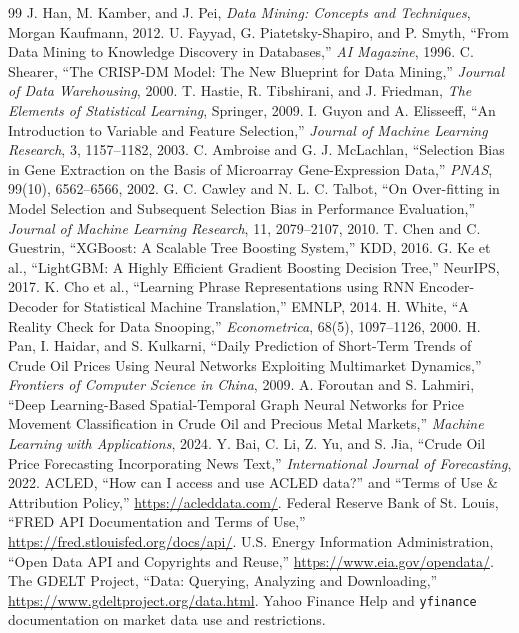 \documentclass[10pt,a4paper]{article}
\newcommand{\code}[1]{\texttt{#1}}
\begin{document}
\begin{thebibliography}{99}
     J. Han, M. Kamber, and J. Pei, \textit{Data Mining: Concepts and Techniques}, Morgan Kaufmann, 2012.
     U. Fayyad, G. Piatetsky-Shapiro, and P. Smyth, ``From Data Mining to Knowledge Discovery in Databases,'' \textit{AI Magazine}, 1996.
     C. Shearer, ``The CRISP-DM Model: The New Blueprint for Data Mining,'' \textit{Journal of Data Warehousing}, 2000.
     T. Hastie, R. Tibshirani, and J. Friedman, \textit{The Elements of Statistical Learning}, Springer, 2009.
     I. Guyon and A. Elisseeff, ``An Introduction to Variable and Feature Selection,'' \textit{Journal of Machine Learning Research}, 3, 1157--1182, 2003.
     C. Ambroise and G. J. McLachlan, ``Selection Bias in Gene Extraction on the Basis of Microarray Gene-Expression Data,'' \textit{PNAS}, 99(10), 6562--6566, 2002.
     G. C. Cawley and N. L. C. Talbot, ``On Over-fitting in Model Selection and Subsequent Selection Bias in Performance Evaluation,'' \textit{Journal of Machine Learning Research}, 11, 2079--2107, 2010.
     T. Chen and C. Guestrin, ``XGBoost: A Scalable Tree Boosting System,'' KDD, 2016.
     G. Ke et al., ``LightGBM: A Highly Efficient Gradient Boosting Decision Tree,'' NeurIPS, 2017.
     K. Cho et al., ``Learning Phrase Representations using RNN Encoder-Decoder for Statistical Machine Translation,'' EMNLP, 2014.
     H. White, ``A Reality Check for Data Snooping,'' \textit{Econometrica}, 68(5), 1097--1126, 2000.
     H. Pan, I. Haidar, and S. Kulkarni, ``Daily Prediction of Short-Term Trends of Crude Oil Prices Using Neural Networks Exploiting Multimarket Dynamics,'' \textit{Frontiers of Computer Science in China}, 2009.
     A. Foroutan and S. Lahmiri, ``Deep Learning-Based Spatial-Temporal Graph Neural Networks for Price Movement Classification in Crude Oil and Precious Metal Markets,'' \textit{Machine Learning with Applications}, 2024.
     Y. Bai, C. Li, Z. Yu, and S. Jia, ``Crude Oil Price Forecasting Incorporating News Text,'' \textit{International Journal of Forecasting}, 2022.
     ACLED, ``How can I access and use ACLED data?'' and ``Terms of Use \& Attribution Policy,'' \url{https://acleddata.com/}.
     Federal Reserve Bank of St. Louis, ``FRED API Documentation and Terms of Use,'' \url{https://fred.stlouisfed.org/docs/api/}.
     U.S. Energy Information Administration, ``Open Data API and Copyrights and Reuse,'' \url{https://www.eia.gov/opendata/}.
     The GDELT Project, ``Data: Querying, Analyzing and Downloading,'' \url{https://www.gdeltproject.org/data.html}.
     Yahoo Finance Help and \code{yfinance} documentation on market data use and restrictions.
\end{thebibliography}
\end{document}
